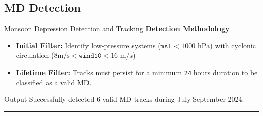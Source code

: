 \documentclass[aspectratio=169,t,xcolor=table]{beamer}
\begin{document}
\subsection{MD Detection}
\begin{frame}{Monsoon Depression Detection and Tracking}
	\textbf{\small Detection Methodology}
	\footnotesize
	\begin{itemize}
		\item \textbf{Initial Filter:} Identify low-pressure systems ($\texttt{msl} < 1000 \text{ hPa}$) with cyclonic circulation ($8 \text{m/s} < \texttt{wind10} < 16 \text{ m/s}$)\footnotemark
		\item \textbf{Lifetime Filter:} Tracks must persist for a minimum \texttt{24} hours duration  to be classified as a valid MD.
	\end{itemize}

	\vspace{1.5cm}

	\begin{alertblock}{\small Output}
		\footnotesize
		Successfully detected 6 valid MD tracks during July-September 2024.
	\end{alertblock}

	\vspace{1cm}

	\hrule
\end{frame}
\end{document}
